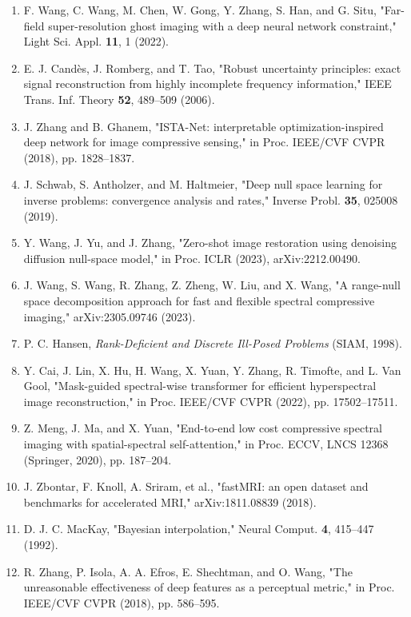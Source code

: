 \documentclass[11pt]{article}
\begin{document}
\begin{enumerate}
\item F. Wang, C. Wang, M. Chen, W. Gong, Y. Zhang, S. Han, and G. Situ, "Far-field super-resolution ghost imaging with a deep neural network constraint," Light Sci. Appl. \textbf{11}, 1 (2022).
\item E. J. Candès, J. Romberg, and T. Tao, "Robust uncertainty principles: exact signal reconstruction from highly incomplete frequency information," IEEE Trans. Inf. Theory \textbf{52}, 489--509 (2006).
\item J. Zhang and B. Ghanem, "ISTA-Net: interpretable optimization-inspired deep network for image compressive sensing," in Proc. IEEE/CVF CVPR (2018), pp. 1828--1837.
\item J. Schwab, S. Antholzer, and M. Haltmeier, "Deep null space learning for inverse problems: convergence analysis and rates," Inverse Probl. \textbf{35}, 025008 (2019).
\item Y. Wang, J. Yu, and J. Zhang, "Zero-shot image restoration using denoising diffusion null-space model," in Proc. ICLR (2023), arXiv:2212.00490.
\item J. Wang, S. Wang, R. Zhang, Z. Zheng, W. Liu, and X. Wang, "A range-null space decomposition approach for fast and flexible spectral compressive imaging," arXiv:2305.09746 (2023).
\item P. C. Hansen, \textit{Rank-Deficient and Discrete Ill-Posed Problems} (SIAM, 1998).
\item Y. Cai, J. Lin, X. Hu, H. Wang, X. Yuan, Y. Zhang, R. Timofte, and L. Van Gool, "Mask-guided spectral-wise transformer for efficient hyperspectral image reconstruction," in Proc. IEEE/CVF CVPR (2022), pp. 17502--17511.
\item Z. Meng, J. Ma, and X. Yuan, "End-to-end low cost compressive spectral imaging with spatial-spectral self-attention," in Proc. ECCV, LNCS 12368 (Springer, 2020), pp. 187--204.
\item J. Zbontar, F. Knoll, A. Sriram, et al., "fastMRI: an open dataset and benchmarks for accelerated MRI," arXiv:1811.08839 (2018).
\item D. J. C. MacKay, "Bayesian interpolation," Neural Comput. \textbf{4}, 415--447 (1992).
\item R. Zhang, P. Isola, A. A. Efros, E. Shechtman, and O. Wang, "The unreasonable effectiveness of deep features as a perceptual metric," in Proc. IEEE/CVF CVPR (2018), pp. 586--595.
\end{enumerate}
\end{document}
